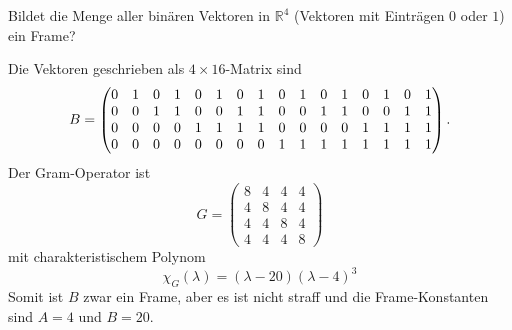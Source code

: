 Bildet die Menge aller binären Vektoren in $\mathbb R^4$ (Vektoren mit
Einträgen $0$ oder $1$) ein Frame?

\begin{loesung}
Die Vektoren geschrieben als $4\times 16$-Matrix sind
\[
\setcounter{MaxMatrixCols}{16}
B
=
\begin{pmatrix}
0&1&0&1&0&1&0&1&0&1&0&1&0&1&0&1\\
0&0&1&1&0&0&1&1&0&0&1&1&0&0&1&1\\
0&0&0&0&1&1&1&1&0&0&0&0&1&1&1&1\\
0&0&0&0&0&0&0&0&1&1&1&1&1&1&1&1
\end{pmatrix}.
\]
Der Gram-Operator ist
\[
G=
\begin{pmatrix}
8&4&4&4\\
4&8&4&4\\
4&4&8&4\\
4&4&4&8
\end{pmatrix}
\]
mit charakteristischem Polynom
\[
\chi_{G}(\lambda)
=
(\lambda-20)(\lambda-4)^3
\]
Somit ist $B$ zwar ein Frame, aber es ist nicht straff und die
Frame-Konstanten sind $A=4$ und $B=20$.
\end{loesung}


